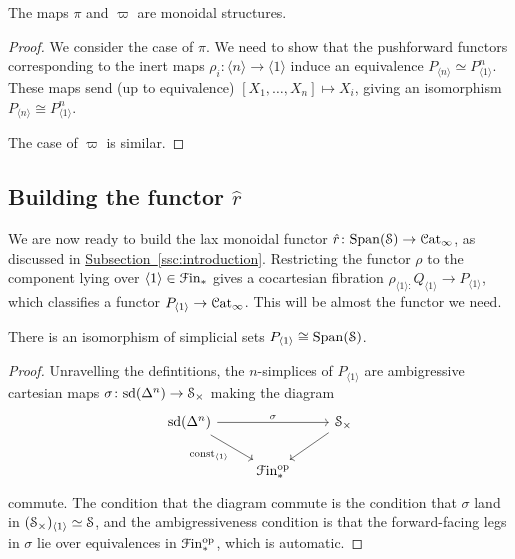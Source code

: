 \documentclass[main.tex]{subfiles}
\begin{document}
\begin{proposition}
  The maps $\pi$ and $\varpi$ are monoidal structures.
\end{proposition}
\begin{proof}
  We consider the case of $\pi$. We need to show that the pushforward functors corresponding to the inert maps $\rho_{i}\colon \langle n \rangle \to \langle 1 \rangle$ induce an equivalence $P_{\langle n \rangle} \simeq P_{\langle 1 \rangle}^{n}$. These maps send (up to equivalence) $[X_{1}, \ldots, X_{n}] \mapsto X_{i}$, giving an isomorphism $P_{\langle n \rangle} \cong P_{\langle 1 \rangle}^{n}$.

  The case of $\varpi$ is similar.
\end{proof}

\subsection{Building the functor \texorpdfstring{$\hat{r}$}{r}}
\label{ssc:building_the_functor}

We are now ready to build the lax monoidal functor $\hat{r}\colon \Span(\S) \to \ICat$, as discussed in \hyperref[ssc:introduction]{Subsection~\ref*{ssc:introduction}}. Restricting the functor $\rho$ to the component lying over $\langle 1 \rangle \in \Finp$ gives a cocartesian fibration $\rho_{\langle 1 \rangle\colon }Q_{\langle 1 \rangle} \to P_{\langle 1 \rangle}$, which classifies a functor $P_{\langle 1 \rangle} \to \ICat$. This will be almost the functor we need.

\begin{proposition}
  There is an isomorphism of simplicial sets $P_{\langle 1 \rangle} \cong \Span(\S)$.
\end{proposition}
\begin{proof}
  Unravelling the defintitions, the $n$-simplices of $P_{\langle 1 \rangle}$ are ambigressive cartesian maps $\sigma\colon \sd(\Delta^{n}) \to \S_{\times}$ making the diagram
  \begin{equation*}
    \begin{tikzcd}
      \sd(\Delta^{n})
      \arrow[rr, "\sigma"]
      \arrow[dr, swap, "\const_{\langle 1 \rangle}"]
      && \S_{\times}
      \arrow[dl]
      \\
      & \Finp\op
    \end{tikzcd}
  \end{equation*}
  commute. The condition that the diagram commute is the condition that $\sigma$ land in $(\S_{\times})_{\langle 1 \rangle} \simeq \S$, and the ambigressiveness condition is that the forward-facing legs in $\sigma$ lie over equivalences in $\Finp\op$, which is automatic.
\end{proof}
\end{document}
